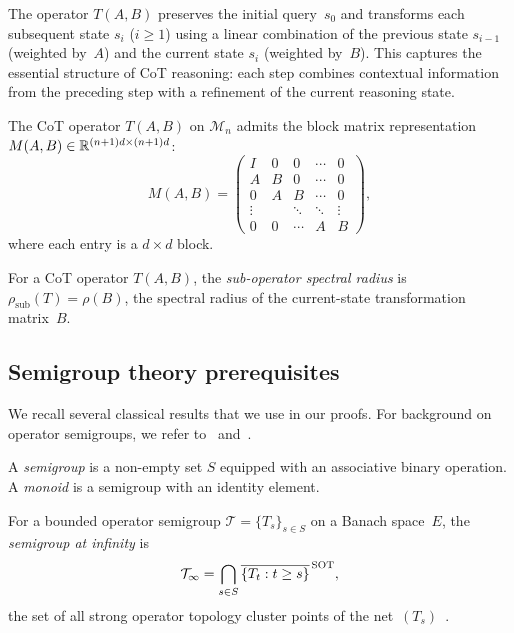 The operator $T(A,B)$ preserves the initial query~$s_0$ and transforms each
subsequent state $s_i$ ($i\geq 1$) using a linear combination of the previous
state $s_{i-1}$ (weighted by~$A$) and the current state $s_i$ (weighted
by~$B$). This captures the essential structure of CoT reasoning: each step
combines contextual information from the preceding step with a refinement of
the current reasoning state.

\begin{definition}\label{def:block}
  The CoT operator $T(A,B)$ on $\mathcal{M}_n$ admits the block matrix
  representation $M(A,B)\in\mathbb{R}^{(n+1)d\times(n+1)d}$:
  \begin{equation}\label{eq:block-matrix}
    M(A,B) =
    \begin{pmatrix}
      I & 0 & 0 & \cdots & 0 \\
      A & B & 0 & \cdots & 0 \\
      0 & A & B & \cdots & 0 \\
      \vdots & & \ddots & \ddots & \vdots \\
      0 & 0 & \cdots & A & B
    \end{pmatrix},
  \end{equation}
  where each entry is a $d\times d$ block.
\end{definition}

\begin{definition}\label{def:rho-sub}
  For a CoT operator $T(A,B)$, the \emph{sub-operator spectral radius} is
  $\rho_{\mathrm{sub}}(T) = \rho(B)$, the spectral radius of the current-state
  transformation matrix~$B$.
\end{definition}

\subsection{Semigroup theory prerequisites}

We recall several classical results that we use in our proofs. For background
on operator semigroups, we refer to~\cite{Gluck2018} and~\cite{Gerlach2017}.

\begin{definition}\label{def:semigroup}
  A \emph{semigroup} is a non-empty set $S$ equipped with an associative binary
  operation. A \emph{monoid} is a semigroup with an identity element.
\end{definition}

\begin{definition}\label{def:semigroup-infty}
  For a bounded operator semigroup $\mathcal{T}=\{T_s\}_{s\in S}$ on a Banach
  space~$E$, the \emph{semigroup at infinity} is
  \[
    \mathcal{T}_\infty = \bigcap_{s\in S}
    \overline{\{T_t : t\geq s\}}^{\,\operatorname{SOT}},
  \]
  the set of all strong operator topology cluster points of the
  net~$(T_s)$~\cite{Gluck2018}.
\end{definition}

